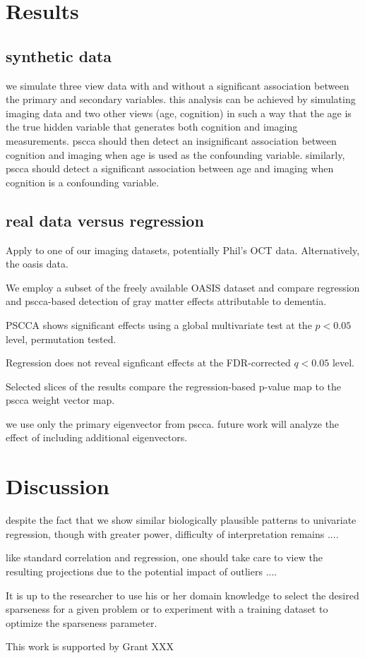 \documentclass{llncs}
\begin{document}
\section{Results}
\subsection{synthetic data}
we simulate three view data with and without a significant association
between the primary and secondary variables.  this analysis can be
achieved by simulating imaging data and two other views (age,
cognition) in such a way that the age is the true hidden variable that
generates both cognition and imaging measurements.  pscca should then
detect an insignificant association between cognition and imaging when
age is used as the confounding variable.  similarly, pscca should
detect a significant association between age and imaging when
cognition is a confounding variable.   

\subsection{real data versus regression}
Apply to one of our imaging datasets, potentially Phil's OCT data.
Alternatively, the oasis data. 

We employ a subset of the freely available OASIS dataset and compare
regression and pscca-based detection of gray matter effects
attributable to dementia.

PSCCA shows significant effects using a global multivariate test at
the $p<0.05$ level, permutation tested.  

Regression does not reveal signficant effects at the FDR-corrected
$q<0.05$ level.  

Selected slices of the results compare the regression-based p-value
map to the pscca weight vector map.  

we use only the primary eigenvector from pscca.  future work will
analyze the effect of including additional eigenvectors. 

\section{Discussion}

despite the fact that we show similar biologically plausible patterns to univariate
regression, though with greater power, 
difficulty of interpretation remains ....  

like standard correlation and regression, one should take care to view the resulting
projections due to the potential impact of outliers .... 

It is up to
the researcher to use his or her domain knowledge to select the
desired sparseness for a given problem or to experiment with a
training dataset to optimize the sparseness parameter.

 This work is supported by Grant XXX 


\end{document}

